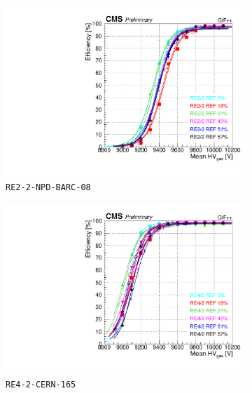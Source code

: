 \begin{figure}[H]
\begin{subfigure}{0.5\linewidth}
    		\includegraphics[width = \linewidth]{fig/chapt5/efficiency_vs_HVgas_RE2_2-REF.pdf}
        	\caption{\label{fig:GIFpp_eff_vs_HVgas:C} \texttt{RE2-2-NPD-BARC-08}}
    	\end{subfigure}
    	\begin{subfigure}{0.5\linewidth}
			\centering
    		\includegraphics[width = \linewidth]{fig/chapt5/efficiency_vs_HVgas_RE4_2-REF.pdf}
        	\caption{\label{fig:GIFpp_eff_vs_HVgas:D} \texttt{RE4-2-CERN-165}}
    	\end{subfigure}
		\caption{\label{fig:GIFpp_eff_vs_HVgas} }
	\end{figure}
	


\clearpage{\pagestyle{empty}\cleardoublepage}
